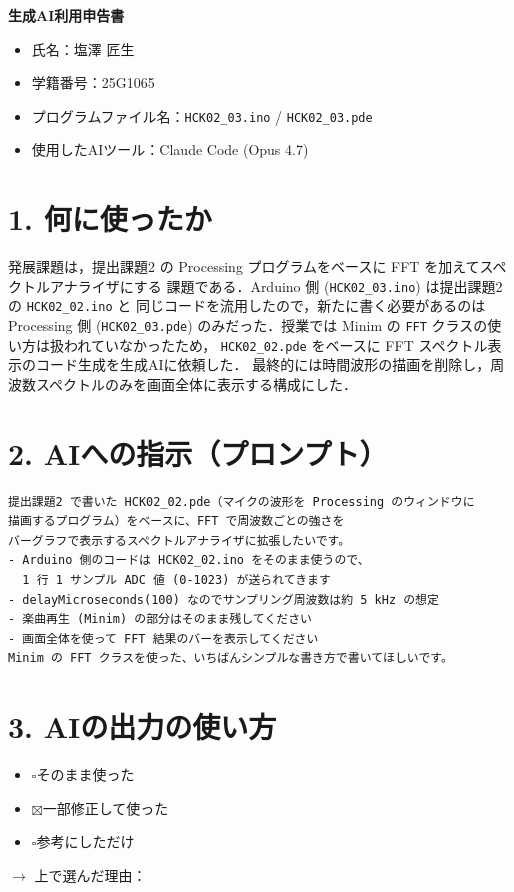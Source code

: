 \documentclass[a4paper,11pt,dvipdfmx]{jsarticle}
\newcommand{\cboxon}{$\boxtimes$}
\newcommand{\cboxoff}{$\square$}
\begin{document}
{\LARGE\bfseries 生成AI利用申告書}
\vspace{1em}

\begin{itemize}
  \item 氏名：塩澤 匠生
  \item 学籍番号：25G1065
  \item プログラムファイル名：\texttt{HCK02\_03.ino} / \texttt{HCK02\_03.pde}
  \item 使用したAIツール：Claude Code (Opus 4.7)
\end{itemize}

\section*{1. 何に使ったか}
発展課題は，提出課題2 の Processing プログラムをベースに FFT を加えてスペクトルアナライザにする
課題である．Arduino 側 (\texttt{HCK02\_03.ino}) は提出課題2 の \texttt{HCK02\_02.ino} と
同じコードを流用したので，新たに書く必要があるのは Processing 側 (\texttt{HCK02\_03.pde})
のみだった．授業では Minim の \texttt{FFT} クラスの使い方は扱われていなかったため，
\texttt{HCK02\_02.pde} をベースに FFT スペクトル表示のコード生成を生成AIに依頼した．
最終的には時間波形の描画を削除し，周波数スペクトルのみを画面全体に表示する構成にした．

\section*{2. AIへの指示（プロンプト）}
\begin{lstlisting}
提出課題2 で書いた HCK02_02.pde（マイクの波形を Processing のウィンドウに
描画するプログラム）をベースに、FFT で周波数ごとの強さを
バーグラフで表示するスペクトルアナライザに拡張したいです。
- Arduino 側のコードは HCK02_02.ino をそのまま使うので、
  1 行 1 サンプル ADC 値 (0-1023) が送られてきます
- delayMicroseconds(100) なのでサンプリング周波数は約 5 kHz の想定
- 楽曲再生 (Minim) の部分はそのまま残してください
- 画面全体を使って FFT 結果のバーを表示してください
Minim の FFT クラスを使った、いちばんシンプルな書き方で書いてほしいです。
\end{lstlisting}

\section*{3. AIの出力の使い方}
\begin{itemize}
  \item \cboxoff そのまま使った
  \item \cboxon 一部修正して使った
  \item \cboxoff 参考にしただけ
\end{itemize}
$\rightarrow$ 上で選んだ理由：
\end{document}
